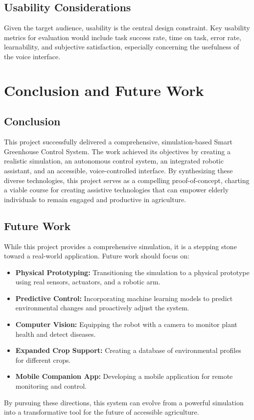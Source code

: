 \documentclass[12pt, a4paper]{report}
\begin{document}
\section{Usability Considerations}
Given the target audience, usability is the central design constraint. Key usability metrics for evaluation would include task success rate, time on task, error rate, learnability, and subjective satisfaction, especially concerning the usefulness of the voice interface.

\chapter{Conclusion and Future Work}

\section{Conclusion}
This project successfully delivered a comprehensive, simulation-based Smart Greenhouse Control System. The work achieved its objectives by creating a realistic simulation, an autonomous control system, an integrated robotic assistant, and an accessible, voice-controlled interface. By synthesizing these diverse technologies, this project serves as a compelling proof-of-concept, charting a viable course for creating assistive technologies that can empower elderly individuals to remain engaged and productive in agriculture.

\section{Future Work}
While this project provides a comprehensive simulation, it is a stepping stone toward a real-world application. Future work should focus on:
\begin{itemize}
    \item \textbf{Physical Prototyping:} Transitioning the simulation to a physical prototype using real sensors, actuators, and a robotic arm.
    \item \textbf{Predictive Control:} Incorporating machine learning models to predict environmental changes and proactively adjust the system.
    \item \textbf{Computer Vision:} Equipping the robot with a camera to monitor plant health and detect diseases.
    \item \textbf{Expanded Crop Support:} Creating a database of environmental profiles for different crops.
    \item \textbf{Mobile Companion App:} Developing a mobile application for remote monitoring and control.
\end{itemize}
By pursuing these directions, this system can evolve from a powerful simulation into a transformative tool for the future of accessible agriculture.
\end{document}
